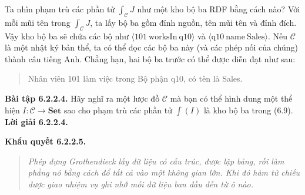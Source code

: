 Ta nhìn phạm trù các phần tử $\int_{\mathcal C}J$ như một kho bộ ba RDF bằng cách nào? Với mỗi mũi tên trong $\int_{\mathcal C}J$, ta lấy bộ ba gồm đỉnh nguồn, tên mũi tên và đỉnh đích. Vậy kho bộ ba sẽ chứa các bộ như $\langle101\ \mathrm{worksIn}\ \text{q10}\rangle$ và $\langle\text{q10}\ \mathrm{name}\ \text{Sales}\rangle$. Nếu $\mathcal C$ là một nhật ký bản thể, ta có thể đọc các bộ ba này (và các phép nối của chúng) thành câu tiếng Anh. Chẳng hạn, hai bộ ba trước có thể được diễn đạt như sau:
\begin{quote}Nhân viên 101 làm việc trong Bộ phận q10, có tên là Sales.\end{quote}
\noindent\textbf{Bài tập 6.2.2.4.} Hãy nghĩ ra một lược đồ $\mathcal C$ mà bạn có thể hình dung một thể hiện $I:\mathcal C\to\mathbf{Set}$ sao cho phạm trù các phần tử $\int(I)$ là kho bộ ba trong (6.9).
\noindent\textbf{Lời giải 6.2.2.4.}\keepwithnext
\begin{center}\end{center}

\noindent\textbf{Khẩu quyết 6.2.2.5.}\keepwithnext
\begin{quote}\itshape Phép dựng Grothendieck lấy dữ liệu có cấu trúc, được lập bảng, rồi làm phẳng nó bằng cách đổ tất cả vào một không gian lớn. Khi đó hàm tử chiếu được giao nhiệm vụ ghi nhớ mỗi dữ liệu ban đầu đến từ ô nào.\end{quote}

